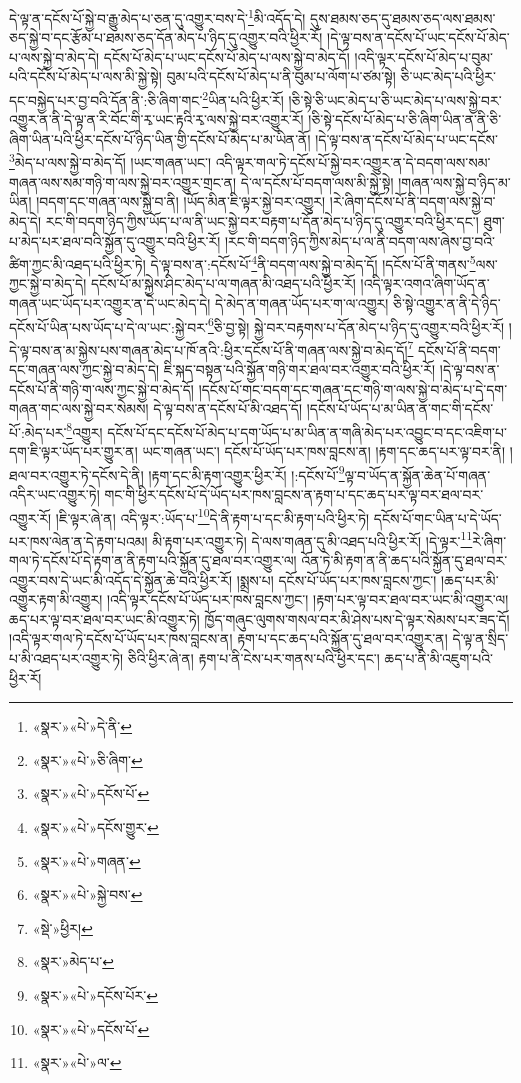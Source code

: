 དེ་ལྟ་ན་དངོས་པོ་སྐྱེ་བ་རྒྱུ་མེད་པ་ཅན་དུ་འགྱུར་བས་དེ་\footnote{«སྣར་»«པེ་»དེ་ནི་}མི་འདོད་དེ། དུས་ཐམས་ཅད་དུ་ཐམས་ཅད་ལས་ཐམས་ཅད་སྐྱེ་བ་དང་རྩོམ་པ་ཐམས་ཅད་དོན་མེད་པ་ཉིད་དུ་འགྱུར་བའི་ཕྱིར་རོ། །དེ་ལྟ་བས་ན་དངོས་པོ་ཡང་དངོས་པོ་མེད་པ་ལས་སྐྱེ་བ་མེད་དེ། དངོས་པོ་མེད་པ་ཡང་དངོས་པོ་མེད་པ་ལས་སྐྱེ་བ་མེད་དོ། །འདི་ལྟར་དངོས་པོ་མེད་པ་བུམ་པའི་དངོས་པོ་མེད་པ་ལས་མི་སྐྱེ་སྟེ། བུམ་པའི་དངོས་པོ་མེད་པ་ནི་བུམ་པ་ལོག་པ་ཙམ་སྟེ། ཅི་ཡང་མེད་པའི་ཕྱིར་དང་བསྐྱེད་པར་བྱ་བའི་དོན་ནི་:ཅི་ཞིག་གང་\footnote{«སྣར་»«པེ་»ཅི་ཞིག་}ཡིན་པའི་ཕྱིར་རོ། །ཅི་སྟེ་ཅི་ཡང་མེད་པ་ཅི་ཡང་མེད་པ་ལས་སྐྱེ་བར་འགྱུར་ན་ནི་དེ་ལྟ་ན་རི་བོང་གི་རྭ་ཡང་རྟའི་རྭ་ལས་སྐྱེ་བར་འགྱུར་རོ། །ཅི་སྟེ་དངོས་པོ་མེད་པ་ཅི་ཞིག་ཡིན་ན་ནི་ཅི་ཞིག་ཡིན་པའི་ཕྱིར་དངོས་པོ་ཉིད་ཡིན་གྱི་དངོས་པོ་མེད་པ་མ་ཡིན་ནོ། །དེ་ལྟ་བས་ན་དངོས་པོ་མེད་པ་ཡང་དངོས་\footnote{«སྣར་»«པེ་»དངོས་པོ་}མེད་པ་ལས་སྐྱེ་བ་མེད་དོ། །ཡང་གཞན་ཡང་། འདི་ལྟར་གལ་ཏེ་དངོས་པོ་སྐྱེ་བར་འགྱུར་ན་དེ་བདག་ལས་སམ་གཞན་ལས་སམ་གཉི་ག་ལས་སྐྱེ་བར་འགྱུར་གྲང་ན། དེ་ལ་དངོས་པོ་བདག་ལས་མི་སྐྱེ་སྟེ། །གཞན་ལས་སྐྱེ་བ་ཉིད་མ་ཡིན། །བདག་དང་གཞན་ལས་སྐྱེ་བ་ནི། །ཡོད་མིན་ཇི་ལྟར་སྐྱེ་བར་འགྱུར། །རེ་ཞིག་དངོས་པོ་ནི་བདག་ལས་སྐྱེ་བ་མེད་དེ། རང་གི་བདག་ཉིད་ཀྱིས་ཡོད་པ་ལ་ནི་ཡང་སྐྱེ་བར་བརྟག་པ་དོན་མེད་པ་ཉིད་དུ་འགྱུར་བའི་ཕྱིར་དང་། ཐུག་པ་མེད་པར་ཐལ་བའི་སྐྱོན་དུ་འགྱུར་བའི་ཕྱིར་རོ། །རང་གི་བདག་ཉིད་ཀྱིས་མེད་པ་ལ་ནི་བདག་ལས་ཞེས་བྱ་བའི་ཚིག་ཀྱང་མི་འཐད་པའི་ཕྱིར་ཏེ། དེ་ལྟ་བས་ན་:དངོས་པོ་\footnote{«སྣར་»«པེ་»དངོས་གྱུར་}ནི་བདག་ལས་སྐྱེ་བ་མེད་དོ། །དངོས་པོ་ནི་གནས་\footnote{«སྣར་»«པེ་»གཞན་}ལས་ཀྱང་སྐྱེ་བ་མེད་དེ། དངོས་པོ་མ་སྐྱེས་ཤིང་མེད་པ་ལ་གཞན་མི་འཐད་པའི་ཕྱིར་རོ། །འདི་ལྟར་འགའ་ཞིག་ཡོད་ན་གཞན་ཡང་ཡོད་པར་འགྱུར་ན་དེ་ཡང་མེད་དེ། དེ་མེད་ན་གཞན་ཡོད་པར་ག་ལ་འགྱུར། ཅི་སྟེ་འགྱུར་ན་ནི་དེ་ཉིད་དངོས་པོ་ཡིན་པས་ཡོད་པ་དེ་ལ་ཡང་:སྐྱེ་བར་\footnote{«སྣར་»«པེ་»སྐྱེ་བས་}ཅི་བྱ་སྟེ། སྐྱེ་བར་བརྟགས་པ་དོན་མེད་པ་ཉིད་དུ་འགྱུར་བའི་ཕྱིར་རོ། །དེ་ལྟ་བས་ན་མ་སྐྱེས་པས་གཞན་མེད་པ་ཁོ་ནའི་:ཕྱིར་དངོས་པོ་ནི་གཞན་ལས་སྐྱེ་བ་མེད་དོ།\footnote{«སྡེ་»ཕྱིར།} དངོས་པོ་ནི་བདག་དང་གཞན་ལས་ཀྱང་སྐྱེ་བ་མེད་དེ། ཇི་སྐད་བསྟན་པའི་སྐྱོན་གཉི་གར་ཐལ་བར་འགྱུར་བའི་ཕྱིར་རོ། །དེ་ལྟ་བས་ན་དངོས་པོ་ནི་གཉི་ག་ལས་ཀྱང་སྐྱེ་བ་མེད་དོ། །དངོས་པོ་གང་བདག་དང་གཞན་དང་གཉི་ག་ལས་སྐྱེ་བ་མེད་པ་དེ་དག་གཞན་གང་ལས་སྐྱེ་བར་སེམས། དེ་ལྟ་བས་ན་དངོས་པོ་མི་འཐད་དོ། །དངོས་པོ་ཡོད་པ་མ་ཡིན་ན་གང་གི་དངོས་པོ་:མེད་པར་\footnote{«སྣར་»མེད་པ་}འགྱུར། དངོས་པོ་དང་དངོས་པོ་མེད་པ་དག་ཡོད་པ་མ་ཡིན་ན་གཞི་མེད་པར་འབྱུང་བ་དང་འཇིག་པ་དག་ཇི་ལྟར་ཡོད་པར་གྱུར་ན། ཡང་གཞན་ཡང་། དངོས་པོ་ཡོད་པར་ཁས་བླངས་ན། །རྟག་དང་ཆད་པར་ལྟ་བར་ནི། །ཐལ་བར་འགྱུར་ཏེ་དངོས་དེ་ནི། །རྟག་དང་མི་རྟག་འགྱུར་ཕྱིར་རོ། །:དངོས་པོ་\footnote{«སྣར་»«པེ་»དངོས་པོར་}ལྟ་བ་ཡོད་ན་སྐྱོན་ཆེན་པོ་གཞན་འདིར་ཡང་འགྱུར་ཏེ། གང་གི་ཕྱིར་དངོས་པོ་དེ་ཡོད་པར་ཁས་བླངས་ན་རྟག་པ་དང་ཆད་པར་ལྟ་བར་ཐལ་བར་འགྱུར་རོ། །ཇི་ལྟར་ཞེ་ན། འདི་ལྟར་:ཡོད་པ་\footnote{«སྣར་»«པེ་»དངོས་པོ་}དེ་ནི་རྟག་པ་དང་མི་རྟག་པའི་ཕྱིར་ཏེ། དངོས་པོ་གང་ཡིན་པ་དེ་ཡོད་པར་ཁས་ལེན་ན་དེ་རྟག་པའམ། མི་རྟག་པར་འགྱུར་ཏེ། དེ་ལས་གཞན་དུ་མི་འཐད་པའི་ཕྱིར་རོ། །དེ་ལྟར་\footnote{«སྣར་»«པེ་»ལ་}རེ་ཞིག་གལ་ཏེ་དངོས་པོ་དེ་རྟག་ན་ནི་རྟག་པའི་སྐྱོན་དུ་ཐལ་བར་འགྱུར་ལ། འོན་ཏེ་མི་རྟག་ན་ནི་ཆད་པའི་སྐྱོན་དུ་ཐལ་བར་འགྱུར་བས་དེ་ཡང་མི་འདོད་དེ་སྐྱོན་ཆེ་བའི་ཕྱིར་རོ། །སྨྲས་པ། དངོས་པོ་ཡོད་པར་ཁས་བླངས་ཀྱང་། །ཆད་པར་མི་འགྱུར་རྟག་མི་འགྱུར། །འདི་ལྟར་དངོས་པོ་ཡོད་པར་ཁས་བླངས་ཀྱང་། །རྟག་པར་ལྟ་བར་ཐལ་བར་ཡང་མི་འགྱུར་ལ། ཆད་པར་ལྟ་བར་ཐལ་བར་ཡང་མི་འགྱུར་ཏེ། ཁྱོད་གཞུང་ལུགས་གསལ་བར་མི་ཤེས་པས་དེ་ལྟར་སེམས་པར་ཟད་དོ། །འདི་ལྟར་གལ་ཏེ་དངོས་པོ་ཡོད་པར་ཁས་བླངས་ན། རྟག་པ་དང་ཆད་པའི་སྐྱོན་དུ་ཐལ་བར་འགྱུར་ན། དེ་ལྟ་ན་སྲིད་པ་མི་འཐད་པར་འགྱུར་ཏེ། ཅིའི་ཕྱིར་ཞེ་ན། རྟག་པ་ནི་ངེས་པར་གནས་པའི་ཕྱིར་དང་། ཆད་པ་ནི་མི་འཇུག་པའི་ཕྱིར་རོ། 